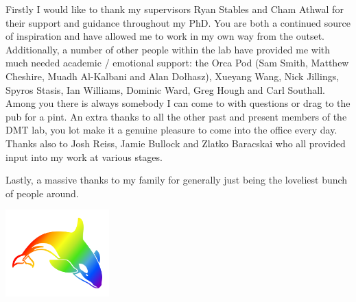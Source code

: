 \begin{acknowledgements}
	Firstly I would like to thank my supervisors Ryan Stables and Cham Athwal for their support and guidance throughout
	my PhD. You are both a continued source of inspiration and have allowed me to work in my own way from the outset.
	Additionally, a number of other people within the lab have provided me with much needed academic / emotional
	support: the Orca Pod (Sam Smith, Matthew Cheshire, Muadh Al-Kalbani and Alan Do\l{}hasz), Xueyang Wang, Nick
	Jillings, Spyros Stasis, Ian Williams, Dominic Ward, Greg Hough and Carl Southall. Among you there is always
	somebody I can come to with questions or drag to the pub for a pint. An extra thanks to all the other past and
	present members of the DMT lab, you lot make it a genuine pleasure to come into the office every day. Thanks also to
	Josh Reiss, Jamie Bullock and Zlatko Baracskai who all provided input into my work at various stages.

	Lastly, a massive thanks to my family for generally just being the loveliest bunch of people around.

	\begin{center}
		\includegraphics[width=0.3\textwidth]{Images/orca.pdf}
	\end{center}
\end{acknowledgements}

\tableofcontents
\listoffigures
\listoftables
{}
\printglossaries
\cleardoublepage
